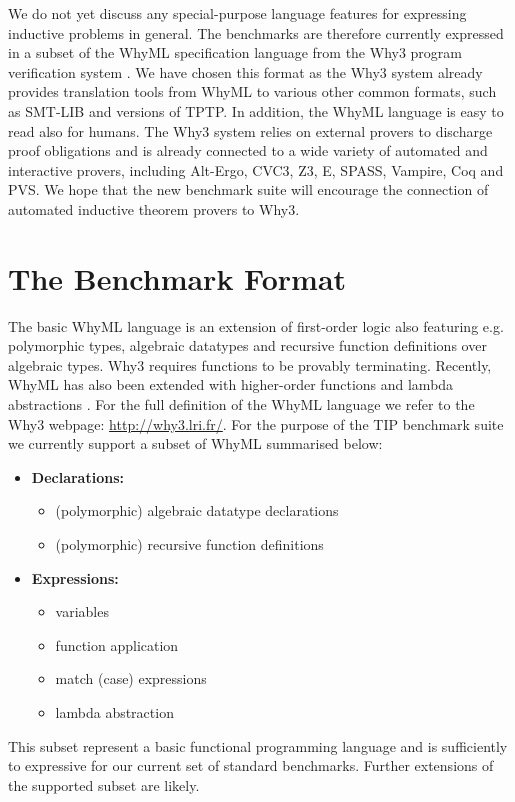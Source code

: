 \documentclass{llncs}
\begin{document}
We do not yet discuss any special-purpose language features for expressing inductive problems in general. The benchmarks are therefore currently expressed in a subset of the WhyML specification language from the Why3 program verification system \cite{boogie11why3,Why3}. We have chosen this format as the Why3 system already provides translation tools from WhyML to various other common formats, such as SMT-LIB and versions of TPTP.
In addition, the WhyML language is easy to read also for humans. The Why3 system relies on external provers to discharge proof obligations and is already connected to a wide variety of automated and interactive provers, including  Alt-Ergo, CVC3, Z3, E, SPASS, Vampire, Coq and PVS. We hope that the new benchmark suite will encourage the connection of automated inductive theorem provers to Why3.

\section{The Benchmark Format}
\label{sec:format}
The basic WhyML language is an extension of first-order logic also featuring e.g. polymorphic types, algebraic datatypes and recursive function definitions over algebraic types. Why3 requires functions to be provably terminating. Recently, WhyML has also been extended with higher-order functions and lambda abstractions \cite{HOWhyML}. For the full definition of the WhyML language we refer to the Why3 webpage: \url{http://why3.lri.fr/}. For the purpose of the TIP benchmark suite we currently support a subset of WhyML summarised below:
\begin{itemize}
\item \textbf{Declarations:}
	\begin{itemize}
	\item (polymorphic) algebraic datatype declarations
	\item (polymorphic) recursive function definitions
	\end{itemize}
\item \textbf{Expressions:}
	\begin{itemize}
	\item variables
	\item function application
	\item match (case) expressions
	\item lambda abstraction
	\end{itemize}
\end{itemize}
This subset represent a basic functional programming language and is sufficiently to expressive for our current set of standard benchmarks. Further extensions of the supported subset are likely.
\end{document}
